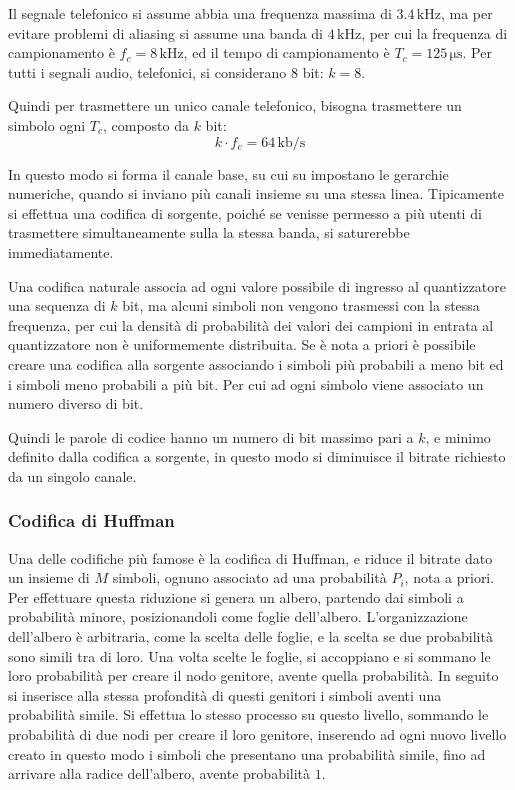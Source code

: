 \documentclass{article}
\numberwithin{equation}{subsection}
\begin{document}
Il segnale telefonico si assume abbia una frequenza massima di $3.4\,\mathrm{kHz}$, ma per evitare problemi di aliasing si assume una banda di $4\,\mathrm{kHz}$, 
per cui la frequenza di campionamento è $f_c=8\,\mathrm{kHz}$, 
ed il tempo di campionamento è $T_c=125\,\mathrm{\mu s}$. Per tutti i segnali audio, telefonici, si considerano $8$ bit: $k=8$. 

Quindi per trasmettere un unico canale telefonico, bisogna trasmettere un simbolo ogni $T_c$, composto da $k$ bit:
\begin{equation}
    k\cdot f_c=64\,\mathrm{kb/s}
\end{equation}

In questo modo si forma il canale base, su cui su impostano le gerarchie numeriche, quando si inviano più canali insieme su una stessa linea. 
Tipicamente si effettua una codifica di sorgente, poiché se venisse permesso a più utenti di trasmettere simultaneamente sulla la stessa banda, 
si saturerebbe immediatamente. 

Una codifica naturale associa ad ogni valore possibile di ingresso al quantizzatore una sequenza di $k$ bit, ma alcuni simboli non vengono trasmessi con la stessa frequenza, 
per cui la densità di probabilità dei valori dei campioni in entrata al quantizzatore non è uniformemente distribuita. Se è nota a priori è possibile 
creare una codifica alla sorgente associando i simboli più probabili a meno bit ed i simboli meno probabili a più bit. Per cui ad ogni simbolo viene associato un numero 
diverso di bit. 

Quindi le parole di codice hanno un numero di bit massimo pari a $k$, e minimo definito dalla codifica a sorgente, in questo modo si diminuisce il bitrate richiesto da un 
singolo canale. 

\subsubsection{Codifica di Huffman}

Una delle codifiche più famose è la codifica di Huffman, e riduce il bitrate dato un insieme di $M$ simboli, ognuno associato ad una probabilità $P_i$, nota a priori. 
Per effettuare questa riduzione si genera un albero, partendo dai simboli a probabilità minore, posizionandoli 
come foglie dell'albero. L'organizzazione dell'albero è arbitraria, come la scelta delle foglie, e la scelta se due probabilità sono simili tra di loro. 
Una volta scelte le foglie, si accoppiano e si sommano le loro probabilità per creare il nodo genitore, avente quella probabilità. In seguito si inserisce alla stessa profondità di questi genitori 
i simboli aventi una probabilità simile. Si effettua lo stesso processo su questo livello, sommando le probabilità di due nodi per creare il loro genitore, inserendo 
ad ogni nuovo livello creato in questo modo i simboli che presentano una probabilità simile, fino ad arrivare alla radice dell'albero, avente probabilità $1$. 
\end{document}

